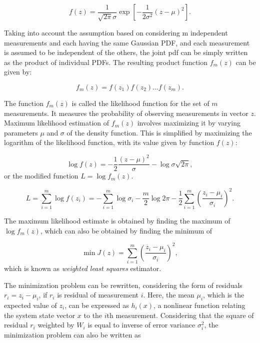 
\begin{equation}
    f(z)=\frac{1}{\sqrt{2 \pi} \sigma} \exp \left[-\frac{1}{2 \sigma^{2}}\left(z-\mu\right)^{2}\right].
\end{equation}

Taking into account the assumption based on considering m independent measurements and each having the same Gaussian PDF, and each measurement is assumed to be independent of the others, the joint pdf can be simply written as the product of individual PDFs. The resulting  product function $f_m(z)$ can be given by:

\begin{equation}
    f_{m}(z)=f\left(z_{1}\right) f\left(z_{2}\right) \ldots f\left(z_{m}\right).
\end{equation}

The function $f_m(z)$ is called the likelihood function for the set of $m$ measurements. It measures the probability of observing measurements in vector $z$. Maximum likelihood estimation of $f_m(z)$ involves maximizing it by varying parameters $\mu$ and $\sigma$ of the density function. This is simplified by maximizing the logarithm of the likelihood function, with its value given by function $f(z)$:

\begin{equation}
    \log f(z)=-\frac{1}{2} \frac{(z-\mu)^{2}}{\sigma}-\log \sigma \sqrt{2 \pi},
\end{equation}
or the modified function \(L=\log f_{m}(z)\).

\begin{equation}
    L=\sum_{i=1}^{m} \log f\left(z_{i}\right)=-\sum_{i=1}^{m} \log \sigma_{i}-\frac{m}{2} \log 2 \pi-\frac{1}{2} \sum_{i=1}^{m}\left(\frac{z_{i}-\mu_{i}}{\sigma_{i}}\right)^{2}.
\end{equation}

The maximum likelihood estimate is obtained by finding the maximum of \(\log f_{m}(z)\), which can also be obtained by finding the minimum of 

\begin{equation}
    \min J(z)=\sum_{i=1}^{m}\left(\frac{z_{i}-\mu_{i}}{\sigma_{i}}\right)^{2},
\label{eq:wls_estimator}    
\end{equation}
which is known as \textit{weighted least squares} estimator.

The minimization problem can be rewritten, considering the form of residuals \(r_{i}=z_{i}-\mu_{i}\), if $r_i$ is residual of measurement $i$. Here, the mean $\mu_{i}$, which is the expected value of $z_{i}$, can be expressed as $h_i(x)$, a nonlinear function relating the system state vector $x$ to the $i$th measurement. Considering that the square of residual $r_i$ weighted by $W_i$ is equal to inverse of error variance $\sigma_{i}^2$, the minimization problem can also be written as

